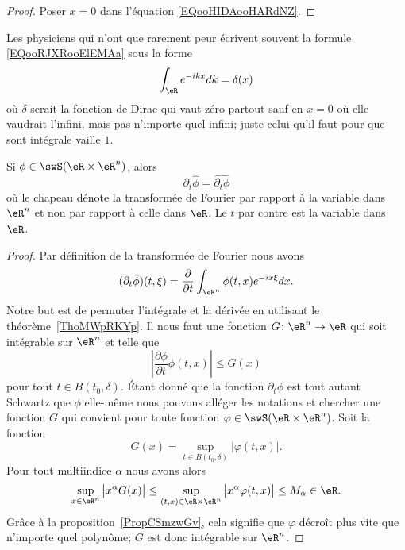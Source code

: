 \begin{proof}
	Poser \( x=0\) dans l'équation \eqref{EQooHIDAooHARdNZ}.
\end{proof}

\begin{normaltext}
	Les physiciens qui n'ont que rarement peur écrivent souvent la formule \eqref{EQooRJXRooElEMAa} sous la forme
	\begin{equation}
		\int_{\eR} e^{-ikx}dk=\delta(x)
	\end{equation}
	où \( \delta\) serait la fonction de Dirac qui vaut zéro partout sauf en \( x=0\) où elle vaudrait l'infini, mais pas n'importe quel infini; juste celui qu'il faut pour que sont intégrale vaille \( 1\).
\end{normaltext}

\begin{lemma}   \label{LemYYjFZSa}
	Si \( \phi\in\swS(\eR\times \eR^n)\), alors
	\begin{equation}
		\partial_t\hat\phi=\widehat{\partial_t\phi}
	\end{equation}
	où le chapeau dénote la transformée de Fourier par rapport à la variable dans \( \eR^n\) et non par rapport à celle dans \( \eR\). Le \( t\) par contre est la variable dans \( \eR\).
\end{lemma}

\begin{proof}
	Par définition de la transformée de Fourier nous avons
	\begin{equation}
		(\partial_t\hat\phi)(t,\xi)=\frac{ \partial  }{ \partial t }\int_{\eR^n}\phi(t,x) e^{-i x\xi}dx.
	\end{equation}
	Notre but est de permuter l'intégrale et la dérivée en utilisant le théorème~\ref{ThoMWpRKYp}. Il nous faut une fonction \( G\colon \eR^n\to \eR\) qui soit intégrable sur \( \eR^n\) et telle que
	\begin{equation}
		\left| \frac{ \partial \phi }{ \partial t }\phi(t,x) \right| \leq G(x)
	\end{equation}
	pour tout \( t\in B(t_0,\delta)\). Étant donné que la fonction \( \partial_t\phi\) est tout autant Schwartz que \( \phi\) elle-même nous pouvons alléger les notations et chercher une fonction \( G\) qui convient pour toute fonction \( \varphi\in\swS(\eR\times \eR^n)\). Soit la fonction
	\begin{equation}
		G(x)=\sup_{t\in B(t_0,\delta)}| \varphi(t,x) |.
	\end{equation}
	Pour tout multiindice \( \alpha\) nous avons alors
	\begin{equation}
		\sup_{x\in \eR^n}\big| x^{\alpha}G(x) \big|\leq \sup_{(t,x)\in \eR\times \eR^n}\big| x^{\alpha}\varphi(t,x) \big|\leq M_{\alpha}\in \eR.
	\end{equation}
	Grâce à la proposition~\ref{PropCSmzwGv}, cela signifie que \( \varphi\) décroît plus vite que n'importe quel polynôme; \( G\) est donc intégrable sur \( \eR^n\).
\end{proof}

